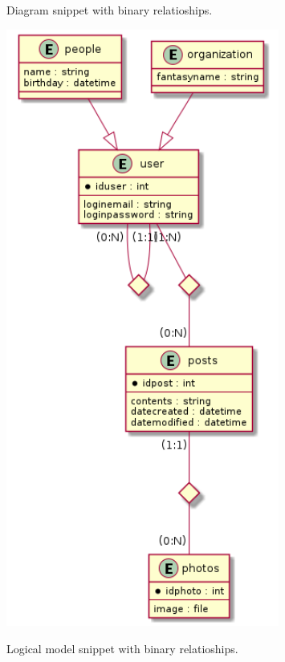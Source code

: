 \begin{figure}[!htb]
  \centering
  \begin{minipage}[b]{0.4\textwidth}
    \caption{Diagram snippet with binary relatioships.}
    \includegraphics[width=0.8\textwidth]{img/Diagram_binary.png}
    \label{fig:Diagram_Binary}
  \end{minipage}
  \hfill
  \begin{minipage}[b]{0.5\textwidth}
    \caption{Logical model snippet with binary relatioships.}
    \label{fig:Logical_Binary}

\end{minipage}
\end{figure}
